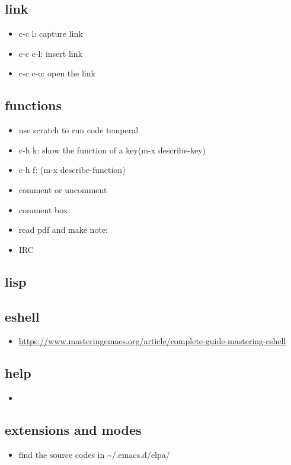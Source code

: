 \documentclass[11pt]{article}
\begin{document}
\subsection{link}
\label{sec:org30bdcf6}
\begin{itemize}
\item c-c l: capture link
\item c-c c-l: insert link
\item c-c c-o: open the link
\end{itemize}
\subsection{functions}
\label{sec:org8f81705}
\begin{itemize}
\item use scratch to run code temperal
\item c-h k: show the function of a key(m-x describe-key)
\item c-h f: (m-x describe-function)
\item comment or uncomment
\item comment box
\item read pdf and make note:
\item IRC
\end{itemize}
\subsection{lisp}
\label{sec:org164dbee}
\subsection{eshell}
\label{sec:orga5f4467}
\begin{itemize}
\item \url{https://www.masteringemacs.org/article/complete-guide-mastering-eshell}
\end{itemize}
\subsection{help}
\label{sec:orgeb827f9}
\begin{itemize}
\item 
\end{itemize}
\subsection{extensions and modes}
\label{sec:org2bdbc28}
\begin{itemize}
\item find the source codes in \textasciitilde{}/.emacs.d/elpa/
\end{itemize}
\end{document}
